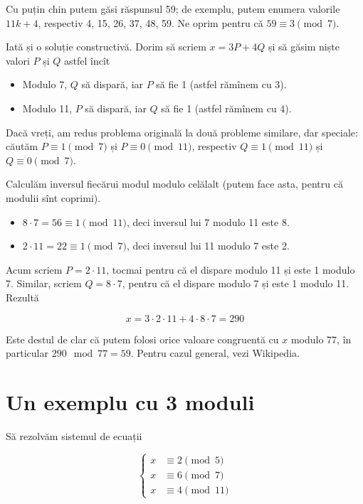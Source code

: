 \documentclass[../main.tex]{subfiles}
\begin{document}
Cu puțin chin putem găsi răspunsul 59; de exemplu, putem enumera valorile $11k + 4$, respectiv 4, 15, 26, 37, 48, 59. Ne oprim pentru că $59 \equiv 3 \pmod{7}$.

Iată și o soluție constructivă. Dorim să scriem $x = 3P + 4Q$ și să găsim niște valori $P$ și $Q$ astfel încît

\begin{itemize}
  \item Modulo 7, $Q$ să dispară, iar $P$ să fie 1 (astfel rămînem cu 3).
  \item Modulo 11, $P$ să dispară, iar $Q$ să fie 1 (astfel rămînem cu 4).
\end{itemize}

Dacă vreți, am redus problema originală la două probleme similare, dar speciale: căutăm $P \equiv 1 \pmod{7}$ și $P \equiv 0 \pmod{11}$, respectiv $Q \equiv 1 \pmod{11}$ și $Q \equiv 0 \pmod{7}$.

Calculăm inversul fiecărui modul modulo celălalt (putem face asta, pentru că modulii sînt coprimi).

\begin{itemize}
  \item $8 \cdot 7 = 56 \equiv 1 \pmod{11}$, deci inversul lui 7 modulo 11 este 8.
  \item $2 \cdot 11 = 22 \equiv 1 \pmod{7}$, deci inversul lui 11 modulo 7 este 2.
\end{itemize}

Acum scriem $P = 2 \cdot 11$, tocmai pentru că el dispare modulo 11 și este 1 modulo 7. Similar, scriem $Q = 8 \cdot 7$, pentru că el dispare modulo 7 și este 1 modulo 11. Rezultă

$$x = 3 \cdot 2 \cdot 11 + 4 \cdot 8 \cdot 7 = 290$$

Este destul de clar că putem folosi orice valoare congruentă cu $x$ modulo 77, în particular $290 \mod 77 = 59$. Pentru cazul general, vezi Wikipedia.

\section{Un exemplu cu 3 moduli}

Să rezolvăm sistemul de ecuații

$$
\begin{cases}
x &\equiv 2 \pmod{5}\\
x &\equiv 6 \pmod{7}\\
x &\equiv 4 \pmod{11}
\end{cases}
$$
\end{document}
